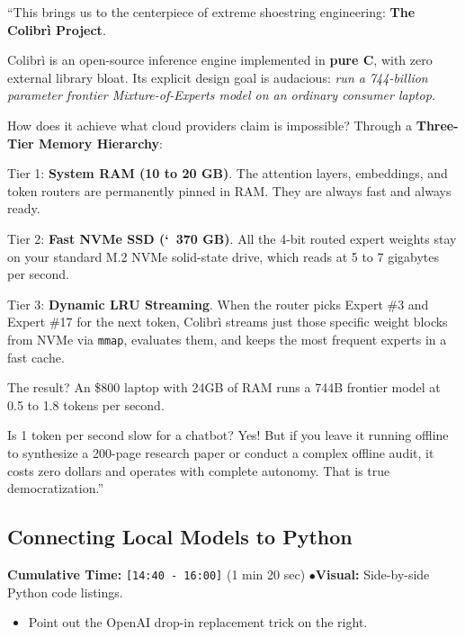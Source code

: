 \documentclass[11pt,a4paper]{article}
\begin{document}
\begin{speechbox}
``This brings us to the centerpiece of extreme shoestring engineering: \textbf{The Colibr\`i Project}.

Colibr\`i is an open-source inference engine implemented in \textbf{pure C}, with zero external library bloat. Its explicit design goal is audacious: \textit{run a 744-billion parameter frontier Mixture-of-Experts model on an ordinary consumer laptop.}

How does it achieve what cloud providers claim is impossible? Through a \textbf{Three-Tier Memory Hierarchy}:

Tier 1: \textbf{System RAM (10 to 20 GB)}. The attention layers, embeddings, and token routers are permanently pinned in RAM. They are always fast and always ready.

Tier 2: \textbf{Fast NVMe SSD (\char`~370 GB)}. All the 4-bit routed expert weights stay on your standard M.2 NVMe solid-state drive, which reads at 5 to 7 gigabytes per second.

Tier 3: \textbf{Dynamic LRU Streaming}. When the router picks Expert \#3 and Expert \#17 for the next token, Colibr\`i streams just those specific weight blocks from NVMe via \texttt{mmap}, evaluates them, and keeps the most frequent experts in a fast cache.

The result? An \$800 laptop with 24GB of RAM runs a 744B frontier model at 0.5 to 1.8 tokens per second.

Is 1 token per second slow for a chatbot? Yes! But if you leave it running offline to synthesize a 200-page research paper or conduct a complex offline audit, it costs zero dollars and operates with complete autonomy. That is true democratization.''
\end{speechbox}

\subsection{Connecting Local Models to Python}
\begin{directionbox}
    \textbf{Cumulative Time:} \texttt{[14:40 - 16:00]} (1 min 20 sec) \quad$\bullet$\quad \textbf{Visual:} Side-by-side Python code listings.
    \begin{itemize}
        \item Point out the OpenAI drop-in replacement trick on the right.
    \end{itemize}
\end{directionbox}
\end{document}
